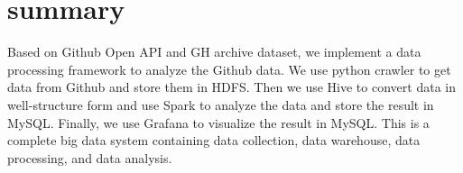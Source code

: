 \section{summary}

Based on Github Open API and GH archive dataset, we implement a data processing framework to analyze the Github data. We use python crawler to get data from Github and store them in HDFS. Then we use Hive to convert data in well-structure form and use Spark to analyze the data and store the result in MySQL. Finally, we use Grafana to visualize the result in MySQL. This is a complete big data system containing data collection, data warehouse, data processing, and data analysis.